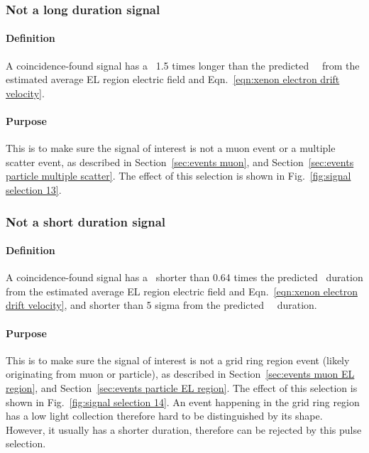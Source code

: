 \subsubsection{Not a long duration signal}
\paragraph{Definition}
A coincidence-found signal has a \rpd\ 1.5 times longer than the predicted \ees\ \rpd\ from the estimated average EL region electric field and Eqn.~\ref{eqn:xenon electron drift velocity}. 
\paragraph{Purpose}
This is to make sure the signal of interest is not a muon event or a multiple scatter event, as described in Section~\ref{sec:events muon}, and Section~\ref{sec:events particle multiple scatter}. The effect of this selection is shown in Fig.~\ref{fig:signal selection 13}. 

\subsubsection{Not a short duration signal}
\paragraph{Definition}
A coincidence-found signal has a \rpd\ shorter than 0.64 times the predicted \ees\ duration from the estimated average EL region electric field and Eqn.~\ref{eqn:xenon electron drift velocity}, and shorter than 5 sigma from the predicted \ees\ \rpd\ duration. 
\paragraph{Purpose}
This is to make sure the signal of interest is not a grid ring region event (likely originating from muon or particle), as described in Section~\ref{sec:events muon EL region}, and Section~\ref{sec:events particle EL region}. The effect of this selection is shown in Fig.~\ref{fig:signal selection 14}. An event happening in the grid ring region has a low light collection therefore hard to be distinguished by its shape. However, it usually has a shorter duration, therefore can be rejected by this pulse selection.

